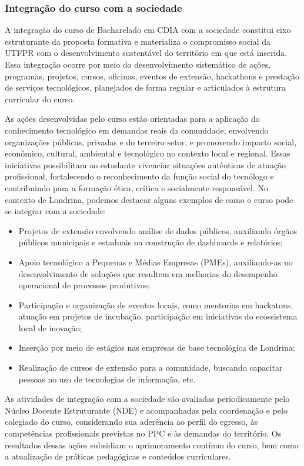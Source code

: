 \subsubsection{Integração do curso com a sociedade}

A integração do curso de Bacharelado em CDIA com a sociedade constitui eixo estruturante da proposta formativa e materializa o compromisso social da UTFPR com o desenvolvimento sustentável do território em que está inserida. Essa integração ocorre por meio do desenvolvimento sistemático de ações, programas, projetos, cursos, oficinas, eventos de extensão, hackathons e prestação de serviços tecnológicos, planejados de forma regular e articulados à estrutura curricular do curso.

As ações desenvolvidas pelo curso estão orientadas para a aplicação do conhecimento tecnológico em demandas reais da comunidade, envolvendo organizações públicas, privadas e do terceiro setor, e promovendo impacto social, econômico, cultural, ambiental e tecnológico no contexto local e regional. Essas iniciativas possibilitam ao estudante vivenciar situações autênticas de atuação profissional, fortalecendo o reconhecimento da função social do tecnólogo e contribuindo para a formação ética, crítica e socialmente responsável. No contexto de Londrina, podemos destacar alguns exemplos de como o curso pode se integrar com a sociedade:
\begin{itemize}
    \item Projetos de extensão envolvendo análise de dados públicos, auxiliando órgãos públicos municipais e estaduais na construção de dashboards e relatórios;
    \item Apoio tecnológico a Pequenas e Médias Empresas (PMEs), auxiliando-as no desenvolvimento de soluções que resultem em melhorias do desempenho operacional de processos produtivos;
    \item Participação e organização de eventos locais, como mentorias em hackatons, atuação em projetos de incubação, participação em iniciativas do ecossistema local de inovação;
    \item Inserção por meio de estágios nas empresas de base tecnológica de Londrina;
    \item Realização de cursos de extensão para a comunidade, buscando capacitar pessoas no uso de tecnologias de informação, etc.
\end{itemize}

As atividades de integração com a sociedade são avaliadas periodicamente pelo Núcleo Docente Estruturante (NDE) e acompanhadas pela coordenação e pelo colegiado do curso, considerando sua aderência ao perfil do egresso, às competências profissionais previstas no PPC e às demandas do território. Os resultados dessas ações subsidiam o aprimoramento contínuo do curso, bem como a atualização de práticas pedagógicas e conteúdos curriculares.

